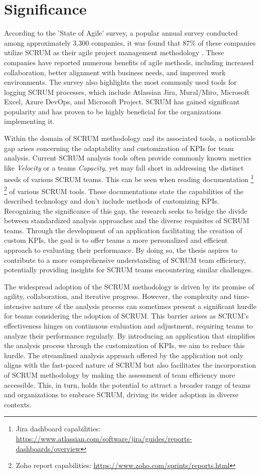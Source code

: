 \section{Significance}

According to the 'State of Agile' survey, a popular annual survey conducted among 
approximately 3,300 companies, it was found that 87\% of these companies utilize SCRUM 
as their agile project management methodology \parencite{StateOfAgile2023}. 
These companies have reported numerous benefits of agile methods, including increased 
collaboration, better alignment with business needs, and improved work environments. 
The survey also highlights the most commonly used tools for logging SCRUM processes, which 
include Atlassian Jira, Mural/Miro, Microsoft Excel, Azure DevOps, and Microsoft Project. 
SCRUM has gained significant popularity and has proven to be highly beneficial for the 
organizations implementing it.

Within the domain of SCRUM methodology and its associated tools, a noticeable 
gap arises concerning the adaptability and customization of KPIs for team analysis. 
Current SCRUM analysis tools often provide commonly known metrics like \textit{Velocity} or a teams \textit{Capacity}, 
yet may fall short in addressing the distinct needs of various SCRUM teams. 
This can be seen when reading documentation
\footnote{Jira dashboard capabilities: \url{https://www.atlassian.com/software/jira/guides/reports-dashboards/overview}}
\footnote{Zoho report capabilities: \url{https://www.zoho.com/sprints/reports.html}} of various SCRUM tools.
These documentations state the capabilities of the described technology and don't include methods of customizing KPIs.
Recognizing the significance of this gap, the research seeks to bridge the divide between 
standardized analysis approaches and the diverse requisites of SCRUM teams. 
Through the development of an application facilitating the creation of custom KPIs, 
the goal is to offer teams a more personalized and efficient approach to evaluating 
their performance. By doing so, the thesis aspires to contribute to a more comprehensive 
understanding of SCRUM team efficiency, potentially providing insights for SCRUM teams 
encountering similar challenges.

The widespread adoption of the SCRUM methodology is driven by its promise of agility, collaboration, and iterative progress. However, the complexity and time-intensive nature of the analysis process can sometimes present a significant hurdle for teams considering the adoption of SCRUM. This barrier arises as SCRUM's effectiveness hinges on continuous evaluation and adjustment, requiring teams to analyze their performance regularly. By introducing an application that simplifies the analysis process through the customization of KPIs, we aim to reduce this hurdle. The streamlined analysis approach offered by the application not only aligns with the fast-paced nature of SCRUM but also facilitates the incorporation of SCRUM methodology by making the assessment of team efficiency more accessible. This, in turn, holds the potential to attract a broader range of teams and organizations to embrace SCRUM, driving its wider adoption in diverse contexts.

